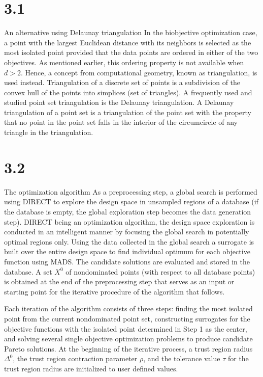 \section{3.1}{An alternative using Delaunay triangulation}
In the biobjective optimization case, a point with the largest Euclidean 
distance with its neighbors is selected as the most isolated point provided 
that the data points are ordered in either of the two objectives. As mentioned 
earlier, this ordering property is not available when $d>2$. Hence, a concept 
from computational geometry, known as triangulation, is used instead. 
Triangulation of a discrete set of points is a subdivision of the convex hull 
of the points into simplices (set of triangles). A frequently used and studied 
point set triangulation is the Delaunay triangulation. A Delaunay 
triangulation of a point set is a triangulation of the point set with the 
property that no point in the point set falls in the interior of the 
circumcircle of any triangle in the triangulation.


\section{3.2}{The optimization algorithm} 
As a preprocessing step, a global search is performed 
using DIRECT to explore the design space in unsampled regions of a database 
(if the database is empty, the global exploration step becomes the data 
generation step). DIRECT being an optimization algorithm, the design space 
exploration is conducted in an intelligent manner by focusing the 
global search in potentially optimal regions only. Using the data collected 
in the global search a surrogate is built over the entire design space to 
find individual optimum for each objective function using MADS. The candidate 
solutions are evaluated and stored in the database. A set $X^0$ of nondominated 
points (with respect to all database points) is obtained at the end of the 
preprocessing step that serves as an input or starting point for the iterative 
procedure of the algorithm that follows. 

Each iteration of the algorithm consists of three steps: finding the most 
isolated point from the current nondominated point set, constructing surrogates 
for the objective functions with the isolated point determined in Step 1 as 
the center, and solving several single objective optimization problems to 
produce candidate Pareto solutions. At the beginning of the iterative process, 
a  trust region radius $\Delta^0$, the trust region contraction parameter 
$\rho$, and the tolerance value $\tau$ for the trust region radius are 
initialized to user defined values. \smallskip



